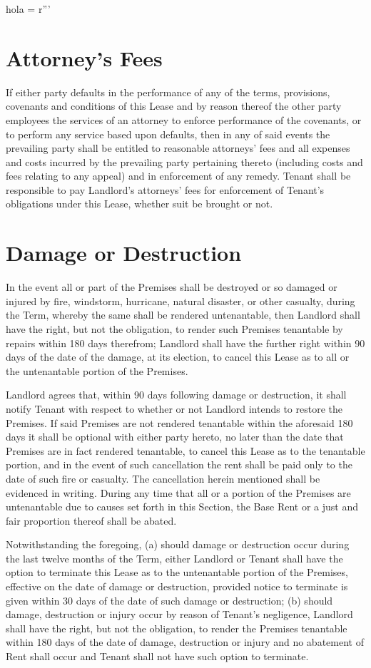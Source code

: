hola = r'''\documentclass{article}
\begin{document}
\section{Attorney's Fees}
    If either party defaults in the performance of any of the terms, provisions, covenants and conditions of this Lease and by reason thereof the other party employees the services of an attorney to enforce performance of the covenants, or to perform any service based upon defaults, then in any of said events the prevailing party shall be entitled to reasonable attorneys' fees and all expenses and costs incurred by the prevailing party pertaining thereto (including costs and fees relating to any appeal) and in enforcement of any remedy. Tenant shall be responsible to pay Landlord's attorneys' fees for enforcement of Tenant's obligations under this Lease, whether suit be brought or not.

\section{Damage or Destruction}
    In the event all or part of the Premises shall be destroyed or so damaged or injured by fire, windstorm, hurricane, natural disaster, or other casualty, during the Term, whereby the same shall be rendered untenantable, then Landlord shall have the right, but not the obligation, to render such Premises tenantable by repairs within 180 days therefrom; Landlord shall have the further right within 90 days of the date of the damage, at its election, to cancel this Lease as to all or the untenantable portion of the Premises.  

    Landlord agrees that, within 90 days following damage or destruction, it shall notify Tenant with respect to whether or not Landlord intends to restore the Premises. If said Premises are not rendered tenantable within the aforesaid 180 days it shall be optional with either party hereto, no later than the date that Premises are in fact rendered tenantable, to cancel this Lease as to the tenantable portion, and in the event of such cancellation the rent shall be paid only to the date of such fire or casualty. The cancellation herein mentioned shall be evidenced in writing. During any time that all or a portion of the Premises are untenantable due to causes set forth in this Section, the Base Rent or a just and fair proportion thereof shall be abated.

    Notwithstanding the foregoing, (a) should damage or destruction occur during the last twelve months of the Term, either Landlord or Tenant shall have the option to terminate this Lease as to the untenantable portion of the Premises, effective on the date of damage or destruction, provided notice to terminate is given within 30 days of the date of such damage or destruction; (b) should damage, destruction or injury occur by reason of Tenant's negligence, Landlord shall have the right, but not the obligation, to render the Premises tenantable within 180 days of the date of damage, destruction or injury and no abatement of Rent shall occur and Tenant shall not have such option to terminate.
\end{document}
